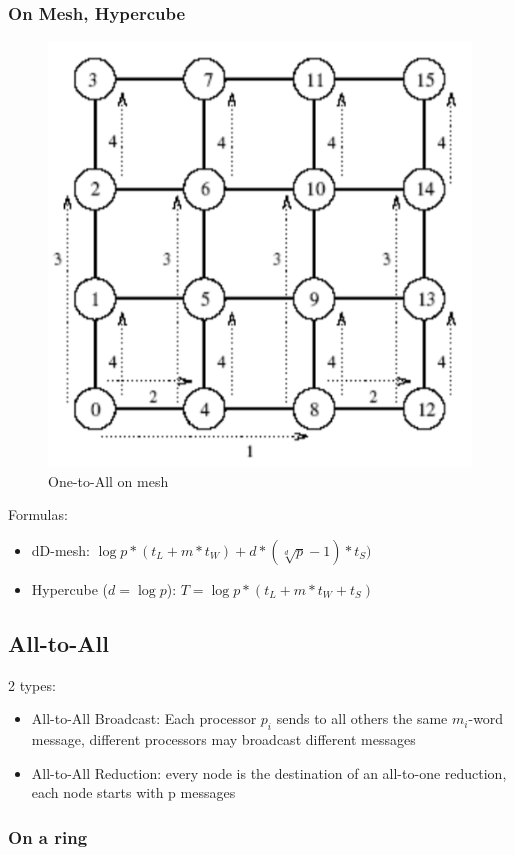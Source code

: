 \documentclass[11pt,a4paper]{report}
\begin{document}
\subsubsection{On Mesh, Hypercube}

\begin{figure}[H]
\centering
\includegraphics[width=0.5\linewidth]{img/comm_mesh_one-to-all}
\caption{One-to-All on mesh}
\label{fig:commmeshone-to-all}
\end{figure}

Formulas: 
\begin{itemize}
    \item dD-mesh:
    $ \log{p}*(t_{L} + m * t_{W}) + d * (\sqrt[d]{p}-1) * t_{S})$
    
    \item Hypercube ($d=\log{p}$):
    $T = \log{p} * (t_{L} + m * t_{W} + t_{S})$
\end{itemize}


\subsection{All-to-All}

2 types:

\begin{itemize}
    \item All-to-All Broadcast: Each processor $p_{i}$ sends to all others the 
    same $m_{i}$-word message, different processors may broadcast different 
    messages
    \item All-to-All Reduction: every node is the destination of 
an all-to-one reduction, each node starts with p messages
\end{itemize}

\subsubsection{On a ring}
\end{document}
